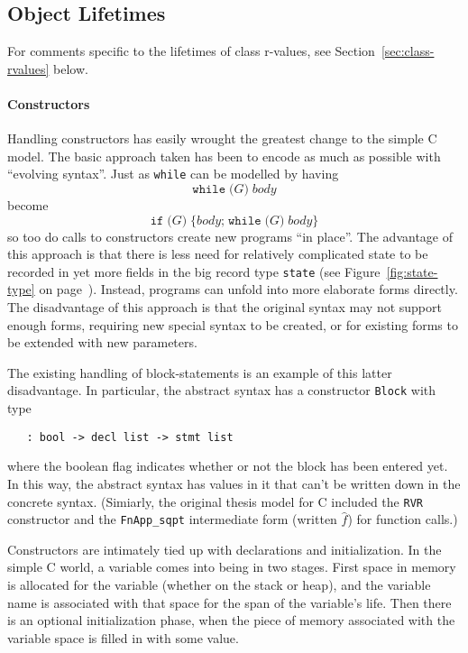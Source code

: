 \documentclass[11pt]{article}
\begin{document}
\subsection{Object Lifetimes}
\label{sec:object-lifetimes}

For comments specific to the lifetimes of class r-values, see
Section~\ref{sec:class-rvalues} below.

\paragraph{Constructors}
Handling constructors has easily wrought the greatest change to the
simple C model.  The basic approach taken has been to encode as much
as possible with ``evolving syntax''.  Just as \texttt{while} can be
modelled by having
\[
\texttt{while}\;\texttt{(}G\texttt{)}\;\mathit{body}
\] become \[
\texttt{if}\;\texttt{(}G\texttt{)}\;\texttt{\{}\mathit{body}\texttt{;}\;\texttt{while}\;\texttt{(}G\texttt{)}\;\mathit{body} \texttt{\}}
\]
so too do calls to \cpp{} constructors create new programs ``in
place''.  The advantage of this approach is that there is less need
for relatively complicated state to be recorded in yet more fields in
the big record type \texttt{state} (see Figure~\ref{fig:state-type} on
page~\pageref{fig:state-type}).  Instead, programs can unfold into
more elaborate forms directly.  The disadvantage of this approach is
that the original syntax may not support enough forms, requiring new
special syntax to be created, or for existing forms to be extended
with new parameters.

The existing handling of block-statements is an example of this latter
disadvantage.  In particular, the abstract syntax has a constructor
\texttt{Block} with type
\begin{verbatim}
   : bool -> decl list -> stmt list
\end{verbatim}
where the boolean flag indicates whether or not the block has been
entered yet.  In this way, the abstract syntax has values in it that
can't be written down in the concrete syntax.  (Simiarly, the original
thesis model for C included the \texttt{RVR} constructor and the
\texttt{FnApp_sqpt} intermediate form (written $\hat{f}$) for function
calls.)

Constructors are intimately tied up with declarations and
initialization.  In the simple C world, a variable comes into being in
two stages.  First space in memory is allocated for the variable
(whether on the stack or heap), and the variable name is associated
with that space for the span of the variable's life.  Then there is an
optional initialization phase, when the piece of memory associated
with the variable space is filled in with some value.
\end{document}
